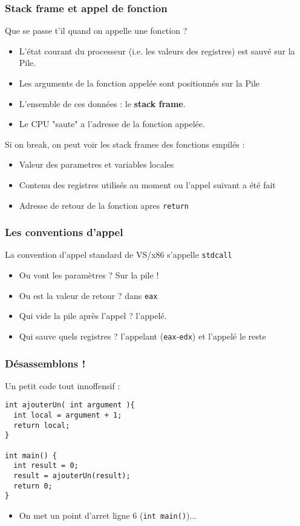 \documentclass{beamer}
\begin{document}
\begin{frame}
\frametitle{Stack frame et appel de fonction}
Que se passe t'il quand on appelle une fonction ?
\begin{itemize}
\item L'état courant du processeur (i.e. les valeurs des registres) est sauvé sur la Pile.
\item Les arguments de la fonction appelée sont positionnés sur la Pile
\item L'ensemble de ces données : le \textbf{stack frame}.
\item Le CPU "saute" a l'adresse de la fonction appelée.
\end{itemize}
Si on break, on peut voir les stack frames des fonctions empilés :
\begin{itemize}
\item Valeur des parametres et variables locales
\item Contenu des registres utilisés au moment ou l'appel suivant a été fait
\item Adresse de retour de la fonction apres \lstinline+return+
\end{itemize} 
\end{frame}

\begin{frame}
\frametitle{Les conventions d'appel} %
La convention d'appel standard de VS/x86 s'appelle \texttt{stdcall}
\begin{itemize}
\item Ou vont les paramètres ? Sur la pile !
\item Ou est la valeur de retour ? dans \texttt{eax}
\item Qui vide la pile après l'appel ? l'appelé.
\item Qui sauve quels registres ? l'appelant (\texttt{eax}-\texttt{edx}) et l'appelé le reste
\end{itemize}
\end{frame}

\begin{frame}[fragile]
\frametitle{Désassemblons !}
Un petit code tout innoffensif :
\begin{lstlisting}
int ajouterUn( int argument ){
  int local = argument + 1;
  return local;
}

int main() {
  int result = 0;
  result = ajouterUn(result);
  return 0;
}
\end{lstlisting}
\begin{itemize}
\item On met un point d'arret ligne 6 (\lstinline+int main()+)...
\end{itemize}
\end{frame}
\end{document}
